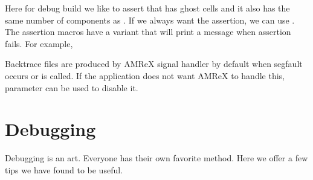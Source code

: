 \documentclass[letterpaper,10pt,english]{sphinxmanual}
\begin{document}
\begin{sphinxVerbatim}[commandchars=\\\{\}]
      
\end{sphinxVerbatim}

\sphinxAtStartPar
Here for debug build we like to assert that  has ghost cells
and it also has the same number of components as . If we
always want the assertion, we can use .  The
assertion macros have a  variant that will print a
message when assertion fails.  For example,

\begin{sphinxVerbatim}[commandchars=\\\{\}]
  
\end{sphinxVerbatim}

\sphinxAtStartPar
Backtrace files are produced by AMReX signal handler by default when
segfault occurs or  is called.  If the application does not
want AMReX to handle this,  parameter
 can be used to disable it.


\section{Debugging}
\label{\detokenize{Basics:debugging}}\label{\detokenize{Basics:sec-basics-debugging}}
\sphinxAtStartPar
Debugging is an art.  Everyone has their own favorite method.  Here we
offer a few tips we have found to be useful.
\end{document}
